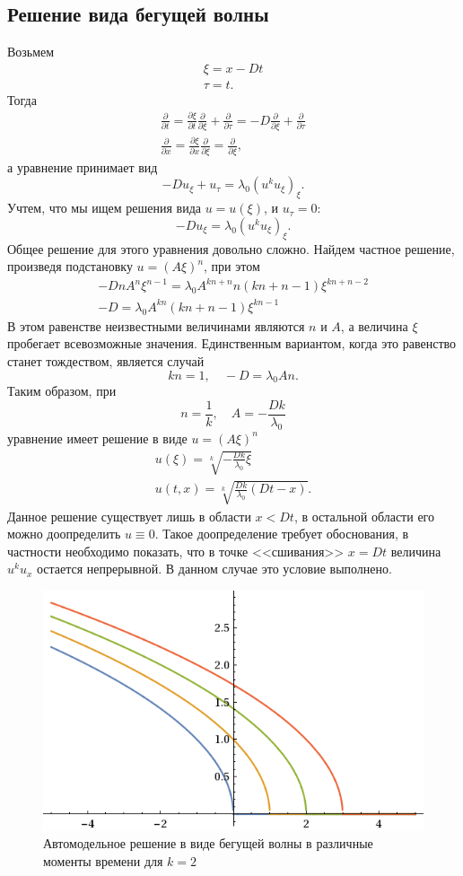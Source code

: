 \documentclass[12pt]{article}
\newcommand{\pd}[2]{\frac{\partial #1}{\partial #2}}
\begin{document}
\subsection{Решение вида бегущей волны}
Возьмем
\begin{gather}
\xi = x - D t\\
\tau = t.
\end{gather}
Тогда
\begin{gather*}
\pd{}{t} = \pd{\xi}{t} \pd{}{\xi} + \pd{}{\tau} = -D\pd{}{\xi} + \pd{}{\tau}\\
\pd{}{x} = \pd{\xi}{x} \pd{}{\xi} = \pd{}{\xi},
\end{gather*}
а уравнение принимает вид
\[
-Du_\xi + u_\tau = \lambda_0(u^k u_\xi)_\xi.
\]
Учтем, что мы ищем решения вида $u = u(\xi)$, и $u_\tau = 0$:
\[
-Du_\xi = \lambda_0(u^k u_\xi)_\xi.
\]
Общее решение для этого уравнения довольно сложно. Найдем частное решение, произведя подстановку $u = (A \xi)^n$, при этом
\begin{gather*}
-Dn A^n \xi^{n-1} = \lambda_0 A^{kn+n} n (kn+n-1) \xi^{kn+n-2}\\
-D = \lambda_0 A^{kn} (kn+n-1) \xi^{kn-1}
\end{gather*}
В этом равенстве неизвестными величинами являются $n$ и $A$, а величина $\xi$ пробегает всевозможные значения. Единственным вариантом, когда это равенство станет тождеством, является случай
\[
kn = 1, \quad -D = \lambda_0 A n.
\]
Таким образом, при 
\[
n = \frac{1}{k}, \quad A = -\frac{Dk}{\lambda_0}
\]
уравнение имеет решение в виде $u = (A\xi)^n$
\begin{gather*}
u(\xi) = \sqrt[k]{-\frac{Dk}{\lambda_0}\xi}\\
u(t, x) = \sqrt[k]{\frac{Dk}{\lambda_0}(D t - x)}.
\end{gather*}
Данное решение существует лишь в области $x < Dt$, в остальной области его можно доопределить $u \equiv 0$. Такое доопределение требует обоснования, в частности необходимо показать, что в точке <<сшивания>> $x = Dt$ величина $u^k u_x$ остается непрерывной. В данном случае это условие выполнено.
\begin{figure}[ht!]
\centering
\includegraphics[width=.5\textwidth]{const.png}
\caption{Автомодельное решение в виде бегущей волны в различные моменты времени для $k = 2$}
\end{figure}
\end{document}
